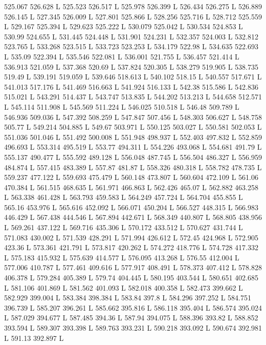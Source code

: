 525.067 526.628 L
525.523 526.517 L
525.978 526.399 L
526.434 526.275 L
526.889 526.145 L
527.345 526.009 L
527.801 525.866 L
528.256 525.716 L
528.712 525.559 L
529.167 525.394 L
529.623 525.222 L
530.079 525.042 L
530.534 524.853 L
530.99 524.655 L
531.445 524.448 L
531.901 524.231 L
532.357 524.003 L
532.812 523.765 L
533.268 523.515 L
533.723 523.253 L
534.179 522.98 L
534.635 522.693 L
535.09 522.394 L
535.546 522.081 L
536.001 521.755 L
536.457 521.414 L
536.913 521.059 L
537.368 520.69 L
537.824 520.305 L
538.279 519.905 L
538.735 519.49 L
539.191 519.059 L
539.646 518.613 L
540.102 518.15 L
540.557 517.671 L
541.013 517.176 L
541.469 516.663 L
541.924 516.133 L
542.38 515.586 L
542.836 515.021 L
543.291 514.437 L
543.747 513.835 L
544.202 513.213 L
544.658 512.571 L
545.114 511.908 L
545.569 511.224 L
546.025 510.518 L
546.48 509.789 L
546.936 509.036 L
547.392 508.259 L
547.847 507.456 L
548.303 506.627 L
548.758 505.77 L
549.214 504.885 L
549.67 503.971 L
550.125 503.027 L
550.581 502.053 L
551.036 501.046 L
551.492 500.008 L
551.948 498.937 L
552.403 497.832 L
552.859 496.693 L
553.314 495.519 L
553.77 494.311 L
554.226 493.068 L
554.681 491.79 L
555.137 490.477 L
555.592 489.128 L
556.048 487.745 L
556.504 486.327 L
556.959 484.874 L
557.415 483.389 L
557.87 481.87 L
558.326 480.318 L
558.782 478.735 L
559.237 477.122 L
559.693 475.479 L
560.148 473.807 L
560.604 472.109 L
561.06 470.384 L
561.515 468.635 L
561.971 466.863 L
562.426 465.07 L
562.882 463.258 L
563.338 461.428 L
563.793 459.583 L
564.249 457.724 L
564.704 455.855 L
565.16 453.976 L
565.616 452.092 L
566.071 450.204 L
566.527 448.315 L
566.983 446.429 L
567.438 444.546 L
567.894 442.671 L
568.349 440.807 L
568.805 438.956 L
569.261 437.122 L
569.716 435.306 L
570.172 433.512 L
570.627 431.744 L
571.083 430.002 L
571.539 428.291 L
571.994 426.612 L
572.45 424.968 L
572.905 423.36 L
573.361 421.791 L
573.817 420.262 L
574.272 418.776 L
574.728 417.332 L
575.183 415.932 L
575.639 414.577 L
576.095 413.268 L
576.55 412.004 L
577.006 410.787 L
577.461 409.616 L
577.917 408.491 L
578.373 407.412 L
578.828 406.378 L
579.284 405.389 L
579.74 404.445 L
580.195 403.544 L
580.651 402.685 L
581.106 401.869 L
581.562 401.093 L
582.018 400.358 L
582.473 399.662 L
582.929 399.004 L
583.384 398.384 L
583.84 397.8 L
584.296 397.252 L
584.751 396.739 L
585.207 396.261 L
585.662 395.816 L
586.118 395.404 L
586.574 395.024 L
587.029 394.677 L
587.485 394.36 L
587.94 394.075 L
588.396 393.82 L
588.852 393.594 L
589.307 393.398 L
589.763 393.231 L
590.218 393.092 L
590.674 392.981 L
591.13 392.897 L

